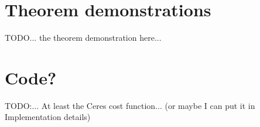\chapter{Theorem demonstrations}
TODO... the theorem demonstration here...


\chapter{Code?}
TODO:...
At least the Ceres cost function... (or maybe I can put it in Implementation details)

